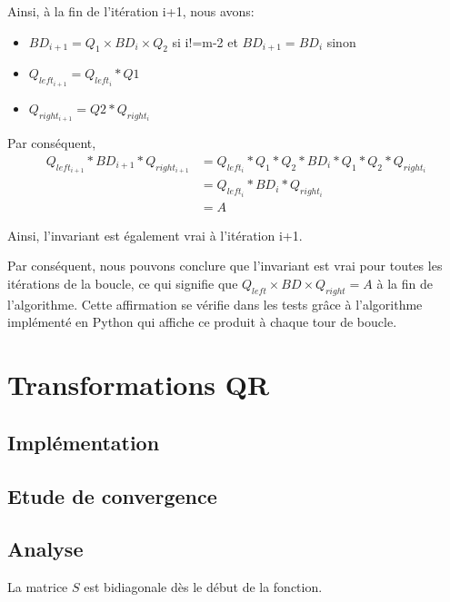 \documentclass{article}
\begin{document}
Ainsi, à la fin de l'itération i+1, nous avons:

\begin{itemize}
  \item $BD_{i+1} = Q_{1} \times BD_{i} \times Q_{2}$ si i!=m-2 et $BD_{i+1} = BD_{i}$ sinon
  \item $Q_{left_{i+1}} = Q_{left_{i}} * Q1$
  \item $Q_{right_{i+1}} = Q2 * Q_{right_{i}}$
\end{itemize}

Par conséquent,
\begin{align}
  Q_{left_{i+1}} * BD_{i+1} * Q_{right_{i+1}} &= Q_{left_{i}} * Q_1 * Q_2 * BD_{i} * Q_1 * Q_2 * Q_{right_{i}} \\
                                          &= Q_{left_{i}} * BD_{i} * Q_{right_{i}} \\
                                          &= A
\end{align}


Ainsi, l'invariant est également vrai à l'itération i+1.

Par conséquent, nous pouvons conclure que l'invariant est vrai pour toutes les itérations de la boucle, ce qui signifie que $Q_{left} \times BD \times Q_{right} = A$ à la fin de l'algorithme.
Cette affirmation se vérifie dans les tests grâce à l'algorithme implémenté en Python qui affiche ce produit à chaque tour de boucle.

\section{Transformations QR}
\label{sec:transfo_qr}

\subsection{Implémentation}
\label{ssec:implem_qr}

\subsection{Etude de convergence}
\label{ssec:conv_qr}

\subsection{Analyse}
\label{ssec:analyse_qr}

La matrice $S$ est bidiagonale dès le début de la fonction.
\end{document}
